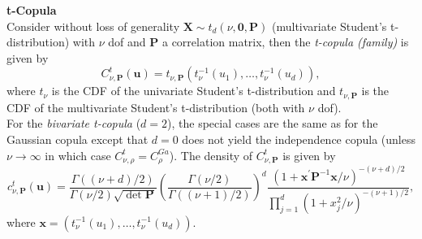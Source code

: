 \textbf{t-Copula}\\
Consider without loss of generality $\bm{X} \sim {t_{d}(\nu, \bm{0}, \mathbf{P})}$ (multivariate Student's t-distribution) with $\nu$ \ac{dof} and $\bm{P}$ a correlation matrix, then the \textit{t-copula (family)} is given by
\begin{equation}
C_{\nu, \bm{P}}^{t}(\mathbf{u})=t_{\nu, \bm{P}}\left(t_{\nu}^{-1}\left(u_{1}\right), \ldots, t_{\nu}^{-1}\left(u_{d}\right)\right),
\end{equation}
where $t_{\nu}$ is the \ac{CDF} of the univariate Student's t-distribution  and $t_{\nu, \bm{P}}$ is the \ac{CDF} of the multivariate Student's t-distribution (both with $\nu$ \ac{dof}).\\
For the \textit{bivariate t-copula} ($d=2$), the special cases are the same as for the Gaussian copula except that $d=0$ does not yield the independence copula (unless $\nu \rightarrow \infty$ in which case  $ C_{\nu, \rho}^{t} = C_{\rho}^{G a}$). The density of $C_{\nu, \bm{P}}^{t}$ is given by
\begin{equation}
c_{\nu, \mathbf{P}}^{t}(\boldsymbol{u})=\frac{\Gamma((\nu+d) / 2)}{\Gamma(\nu / 2) \sqrt{\operatorname{det} \mathbf{P}}}\left(\frac{\Gamma(\nu / 2)}{\Gamma((\nu+1) / 2)}\right)^{d} \frac{\left(1+\boldsymbol{x}^{\prime} \mathbf{P}^{-1} \boldsymbol{x} / \nu\right)^{-(\nu+d) / 2}}{\prod_{j=1}^{d}\left(1+x_{j}^{2} / \nu\right)^{-(\nu+1) / 2}},
\end{equation}
where $\bm{x} = \left(t_{\nu}^{-1}\left(u_{1}\right), \ldots, t_{\nu}^{-1}\left(u_{d}\right)\right)$.
\\

